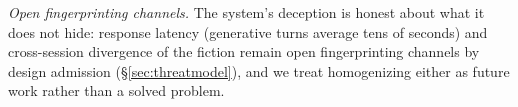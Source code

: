 \emph{Open fingerprinting channels.} The system's deception is honest
about what it does not hide: response latency (generative turns average
tens of seconds) and cross-session divergence of the fiction remain open
fingerprinting channels by design admission
(\S\ref{sec:threatmodel}), and we treat homogenizing either as future
work rather than a solved problem.
